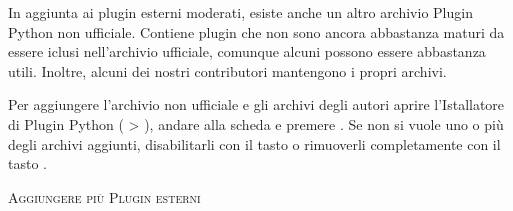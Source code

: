 
In aggiunta ai plugin esterni moderati, esiste anche un altro archivio Plugin Python non ufficiale. Contiene plugin che non sono ancora abbastanza maturi da essere iclusi nell'archivio ufficiale, comunque alcuni possono essere abbastanza utili. Inoltre, alcuni dei nostri contributori mantengono i propri archivi.

Per aggiungere l'archivio non ufficiale e gli archivi degli autori aprire l'Istallatore di Plugin Python ( > ),
andare alla scheda  e premere . Se non si vuole uno o più degli archivi aggiunti, disabilitarli con il tasto
 o rimuoverli completamente con il tasto .

\begin{Tip} \caption{\textsc{Aggiungere più Plugin esterni}}
\end{Tip}

